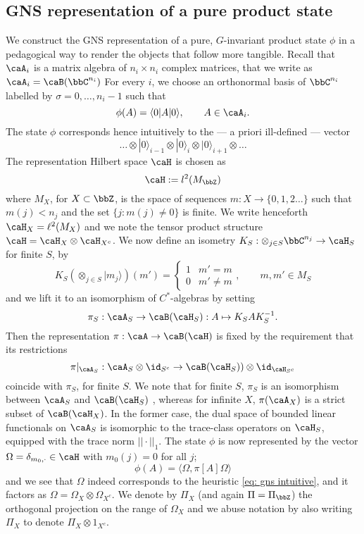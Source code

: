 \subsection{GNS representation of a pure product state}\label{sec:GNS of product state}
We construct the GNS representation of a pure, $G$-invariant product state $\phi$ in a pedagogical way to render the objects that follow more tangible.
Recall that $\caA_i$ is a matrix algebra of $n_i\times n_i$ complex matrices, that we write as $\caA_i= \caB(\bbC^{n_i})$ For every $i$, we choose an orthonormal basis of $\bbC^{n_i}$ labelled by $\sigma=0,\ldots, n_i-1$ such that 
$$
\phi(A)=\langle 0|  A | 0\rangle,\qquad A\in \caA_i.
$$
The state $\phi$ corresponds hence intuitively to the --- a priori ill-defined --- vector 
\begin{equation}\label{eq: gns intuitive}
\ldots \otimes | 0\rangle_{i-1} \otimes | 0\rangle_i \otimes | 0\rangle_{i+1} \otimes \ldots
\end{equation}
The representation Hilbert space $\caH$ is chosen as 
$$
\caH := l^2(M_\bbZ)
$$
where $M_X$, for $X\subset\bbZ$, is the space of sequences $m:X\to \{0,1,2\ldots\}$ such that $m(j) < n_j$ and the set $\{j: m(j)\neq 0\}$ is finite. We write henceforth $\caH_X=\ell^2(M_X)$  and we note the tensor product structure $\caH=\caH_X \otimes \caH_{X^c}$.
We now define an isometry $K_S: \otimes_{j\in S}\bbC^{n_j}\to\caH_S$ for finite $S$, by 
$$
K_S(\otimes_{j\in S}|m_j\rangle)(m')=\begin{cases}  1 &  m'=m \\
0 &   m'\neq m
\end{cases},\qquad   m,m'\in M_S
$$
and we lift it to an isomorphism of $C^*$-algebras by setting
$$
\pi_S: \caA_S \to \caB(\caH_S):  A \mapsto K_SA K_S^{-1}.
$$
Then the representation $\pi:\caA\to\caB(\caH)$ is fixed by the requirement that its restrictions 
$$
\pi|_{\caA_S}:  \caA_S \otimes \id_{S^c} \to   \caB(\caH_S))\otimes \id_{\caH_{S^c}}
$$
coincide with $\pi_S$, for finite $S$.  We note that for finite $S$, $\pi_S$ is an isomorphism between $\caA_S$ and $\caB(\caH_S)$ , whereas for infinite $X$,  $\pi(\caA_X)$ is a strict subset of $\caB(\caH_X)$. In the former case, the dual space of bounded linear functionals on $\caA_S$ is isomorphic to the trace-class operators on $\caH_S$, equipped with the trace norm $||\cdot||_1$.
%
%
The state $\phi$ is now represented by the vector $\Omega=\delta_{m_0,\cdot}\in\caH$ with $m_0(j)=0$ for all $j$; 
$$
\phi(A)=\langle\Omega, \pi[A]\Omega\rangle
$$
and we see that $\Omega$ indeed corresponds to the heuristic \eqref{eq: gns intuitive}, and it factors as $\Omega=\Omega_X\otimes\Omega_{X^c}$.  We denote by $\Pi_X$ (and again $\Pi = \Pi_\bbZ$) the orthogonal projection on the range of $\Omega_X$ and we abuse notation by also writing $\Pi_X$ to denote $\Pi_X\otimes 1_{X^c}$.




